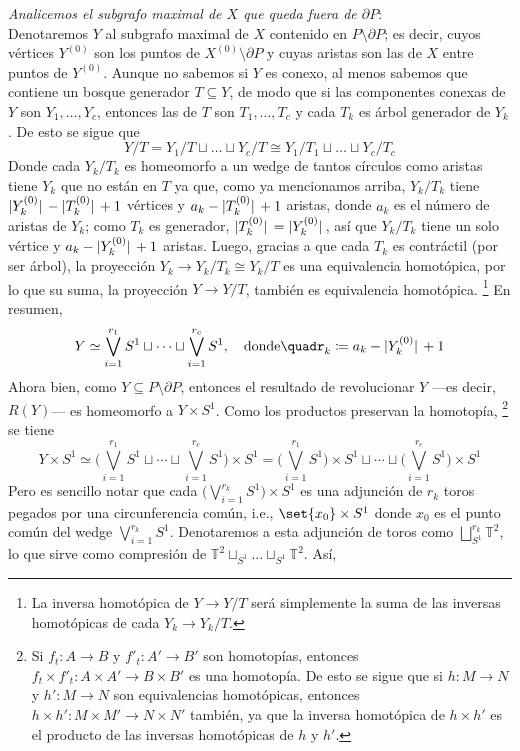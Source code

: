 \begin{sol}
\emph{Analicemos el subgrafo maximal de $X$ que queda fuera de $\partial P$}:\\
Denotaremos $Y$ al subgrafo maximal de $X$ contenido en $P\setminus\partial P$; es decir, cuyos vértices $Y^{(0)}$ son los puntos de $X^{(0)}\setminus\partial P$ y cuyas aristas son las de $X$ entre puntos de $Y^{(0)}$. Aunque no sabemos si $Y$ es conexo, al menos sabemos que contiene un bosque generador $T \subseteq Y$, de modo que si las componentes conexas de $Y$ son $Y_1,\dots,Y_c$, entonces las de $T$ son $T_1,\dots,T_c$ y cada $T_k$ es árbol generador de $Y_k$. De esto se sigue que 
\[
Y/T = Y_1/T \sqcup \dots \sqcup Y_c/T \cong Y_1/T_1 \sqcup \dots \sqcup Y_c/T_c
\]
Donde cada $Y_k/T_k$ es homeomorfo a un wedge de tantos círculos como aristas tiene $Y_k$ que no están en $T$ ya que, como ya mencionamos arriba, $Y_k/T_k$ tiene $\abs*{Y_k^{(0)}}-\abs*{T_k^{(0)}}+1$ vértices y $a_k-\abs*{T_k^{(0)}}+1$ aristas, donde $a_k$ es el número de aristas de $Y_k$; como $T_k$ es generador, $\abs*{T_k^{(0)}}=\abs*{Y_k^{(0)}}$, así que $Y_k/T_k$ tiene un solo vértice y $a_k-\abs*{Y_k^{(0)}}+1$ aristas.
Luego, gracias a que cada $T_k$ es contráctil (por ser árbol), la proyección $Y_k \to Y_k/T_k \cong Y_k/T$ es una equivalencia homotópica, por lo que su suma, la proyección $Y \to Y/T$, también es equivalencia homotópica.%
\footnote{
    La inversa homotópica de $Y \to Y/T$ será simplemente la suma de las inversas homotópicas de cada $Y_k \to Y_k/T$.
} %
En resumen,
\[
Y \simeq \bigvee^{r_1}_{i=1}S^1 \sqcup \cdots \sqcup \bigvee^{r_c}_{i=1}S^1,%
\quad\text{donde}\quad%
r_k \coloneq a_k - \abs*{Y_k^{(0)}} + 1
\]
Ahora bien, como $Y \subseteq P\setminus\partial P$, entonces el resultado de revolucionar $Y$ ---es decir, $R(Y)$--- es homeomorfo a $Y \times S^1$. Como los productos preservan la homotopía,%
\footnote{
    Si $f_t \colon A \to B$ y $f'_t \colon A' \to B'$ son homotopías, entonces $f_t \times f'_t \colon A \times A' \to B \times B'$ es una homotopía. De esto se sigue que si $h \colon M \to N$ y $h'\colon M \to N$ son equivalencias homotópicas, entonces $h \times h' \colon M \times M' \to N \times N'$ también, ya que la inversa homotópica de $h \times h'$ es el producto de las inversas homotópicas de $h$ y $h'$.
}
se tiene 
\[
Y \times S^1%
\simeq \Big(\bigvee^{r_1}_{i=1}S^1 \sqcup \cdots \sqcup \bigvee^{r_c}_{i=1}S^1\Big)\times S^1%
= \Big(\bigvee^{r_1}_{i=1}S^1\Big) \times S^1 \sqcup \cdots \sqcup \Big(\bigvee^{r_c}_{i=1}S^1\Big) \times S^1
\]
Pero es sencillo notar que cada $\Big(\bigvee^{r_k}_{i=1}S^1\Big) \times S^1$ es una adjunción de $r_k$ toros pegados por una circunferencia común, i.e., $\set{x_0} \times S^1$ donde $x_0$ es el punto común del wedge $\bigvee^{r_k}_{i=1}S^1$. Denotaremos a esta adjunción de toros como $\bigsqcup^{r_k}_{S^1} \mathbb{T}^2$, lo que sirve como compresión de $\mathbb{T}^2 \sqcup_{S^1}\dots\sqcup_{S^1}\mathbb{T}^2$. Así,

\end{sol}
